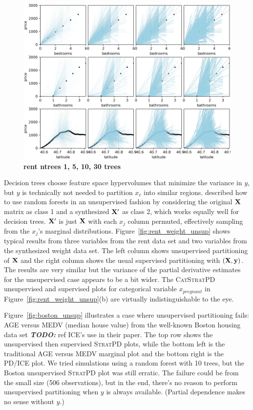 \documentclass[12pt]{article}
\newcommand{\figref}[1]{Figure~\ref{#1}}
\newcommand{\todo}[1]{{\bf\em TODO:} {{#1}}}
\newcommand{\spd}{\fontfamily{cmr}\textsc{\small StratPD}}
\newcommand{\cspd}{\fontfamily{cmr}\textsc{\small CatStratPD}}
\newcommand{\xnc}{$x_{\overline{c}}$}
\begin{document}
\begin{figure}[htbp]
\begin{center}
\includegraphics[scale=0.5]{images/rent_ntrees.png}
\caption{{\bf  rent ntrees 1, 5, 10, 30 trees}}
\label{fig:rent_ntrees}
\end{center}
\end{figure}

Decision trees choose feature space hypervolumes that minimize the variance in $y$, but $y$ is technically not needed to partition \xnc{} into similar regions. \cite{RFunsup} described how to use random forests in an unsupervised fashion by considering the original $\bf X$ matrix as class 1 and a synthesized $\bf X'$ as class 2, which works equally well for decision trees. $\bf X'$ is just $\bf X$ with each $x_j$ column permuted, effectively sampling from the $x_j$'s marginal distributions. \figref{fig:rent_weight_unsup} shows typical results from three variables from the rent data set and two variables from the synthesized weight data set.  The left column shows unsupervised partitioning of $\bf X$ and the right column shows the usual supervised partitioning with $(\bf X, y)$. The results are very similar but the variance of the partial derivative estimates for the unsupervised case appears to be a bit wider. The \cspd{} unsupervised and supervised plots for categorical variable $x_{pregnant}$ in \figref{fig:rent_weight_unsup}(b) are virtually indistinguishable to the eye. 

\figref{fig:boston_unsup} illustrates a case where unsupervised partitioning fails: AGE versus MEDV (median house value) from the well-known Boston housing data set \todo{ref ICE's use in their paper}. The top row shows the unsupervised then supervised \spd{} plots, while the bottom left is the traditional AGE versus MEDV marginal plot and the bottom right is the PD/ICE plot. We tried simulations using a random forest with 10 trees, but the Boston unsupervised \spd{} plot was still erratic. The failure could be from the small size (506 observations), but in the end, there's no reason to perform unsupervised partitioning when $y$ is always available. (Partial dependence makes no sense without $y$.) 
\end{document}
